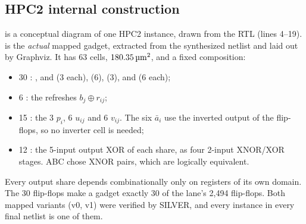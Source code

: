 \subsection{HPC2 internal construction}\label{app:hpc2}
 is a conceptual diagram of one HPC2 instance, drawn from the RTL (lines 4--19).  is the \emph{actual} mapped gadget, extracted from the synthesized netlist and laid out by Graphviz. It has 63 cells, $180.35\,\si{\micro\meter\squared}$, and a fixed composition:
\begin{itemize}
  \item 30 : ,  and  (3 each),  (6),  (3),  and  (6 each);
  \item 6 : the refreshes $b_j \oplus r_{ij}$;
  \item 15 : the 3 $p_i$, 6 $u_{ij}$ and 6 $v_{ij}$. The six $\bar a_i$ use the inverted output  of the  flip-flops, so no inverter cell is needed;
  \item 12 : the 5-input output XOR of each share, as four 2-input XNOR/XOR stages. ABC chose XNOR pairs, which are logically equivalent.
\end{itemize}
Every output share depends combinationally only on registers of its own domain. The 30 flip-flops make a gadget exactly 30 of the lane's 2,494 flip-flops. Both mapped variants (v0, v1) were verified by SILVER, and every instance in every final netlist is one of them.

